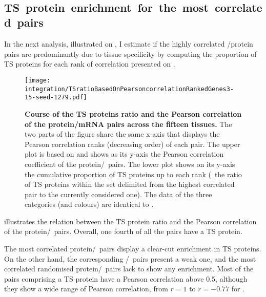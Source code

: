 \FloatBarrier\
\subsection{TS~protein~enrichment~for~the~most~correlated~pairs}
In the next analysis, illustrated on \Cref{fig:Spe_Cor},
I estimate if the highly correlated \mRNA/protein pairs
are predominantly due to tissue specificity
by computing the proportion of \gls{TS} proteins
for each rank of correlation presented on .

\begin{figure}[!htb]
    \texttt{[image: integration/TSratioBasedOnPearsoncorrelationRankedGenes3-15-seed-1279.pdf]}\centering
    \vspace{-3mm}
    \caption[Course of the TS proteins ratio and the Pearson correlation
    of protein/mRNA pairs]{\label{fig:Spe_Cor}%
    \textbf{Course of the TS proteins ratio and the Pearson correlation
    of the protein/mRNA pairs across the fifteen tissues.}
    The two parts of the figure share the same x-axis
    that displays the Pearson correlation ranks (decreasing order) of each pair.
    The upper plot is based on \Cref{fig:GeneProtCor}
    and shows as its y-axis the Pearson correlation coefficient
    of the protein/\mRNA\ pairs.
    The lower plot shows on its y-axis
    the cumulative proportion of \gls{TS} proteins up to each rank
    (\ie\ the ratio of \gls{TS} proteins
    within the set delimited from the highest correlated pair
    to the currently considered one).
    The data of the three categories (and colours)
    are identical to .}
\end{figure}

\vspace{-1mm}
 illustrates the relation between the \gls{TS} protein ratio
and the Pearson correlation of the protein/\mRNA\ pairs.
Overall, one fourth of all the pairs have a \gls{TS} protein.

The most correlated protein/\mRNA\ pairs display
a clear-cut enrichment in \gls{TS} proteins.
On the other hand, the corresponding \mRNA/\mRNA\ pairs present a weak one,
and the most correlated randomised protein/\mRNA\ pairs
lack to show any enrichment.
Most of the pairs comprising a \gls{TS} protein have
a Pearson correlation above 0.5,
although they show a wide range of Pearson correlation,
from $r=1$ to $r= -0.77$ for .\\
\vspace{-\baselineskip}

